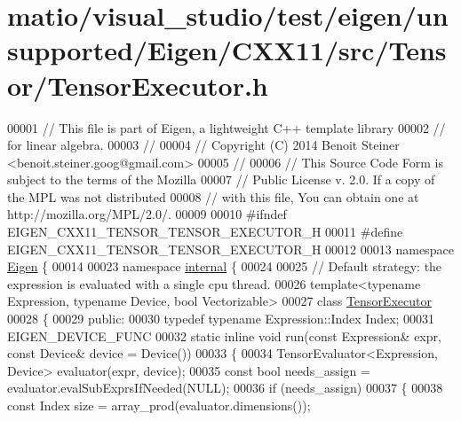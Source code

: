 \hypertarget{matio_2visual__studio_2test_2eigen_2unsupported_2_eigen_2_c_x_x11_2src_2_tensor_2_tensor_executor_8h_source}{}\section{matio/visual\+\_\+studio/test/eigen/unsupported/\+Eigen/\+C\+X\+X11/src/\+Tensor/\+Tensor\+Executor.h}
\label{matio_2visual__studio_2test_2eigen_2unsupported_2_eigen_2_c_x_x11_2src_2_tensor_2_tensor_executor_8h_source}

\begin{DoxyCode}
00001 \textcolor{comment}{// This file is part of Eigen, a lightweight C++ template library}
00002 \textcolor{comment}{// for linear algebra.}
00003 \textcolor{comment}{//}
00004 \textcolor{comment}{// Copyright (C) 2014 Benoit Steiner <benoit.steiner.goog@gmail.com>}
00005 \textcolor{comment}{//}
00006 \textcolor{comment}{// This Source Code Form is subject to the terms of the Mozilla}
00007 \textcolor{comment}{// Public License v. 2.0. If a copy of the MPL was not distributed}
00008 \textcolor{comment}{// with this file, You can obtain one at http://mozilla.org/MPL/2.0/.}
00009 
00010 \textcolor{preprocessor}{#ifndef EIGEN\_CXX11\_TENSOR\_TENSOR\_EXECUTOR\_H}
00011 \textcolor{preprocessor}{#define EIGEN\_CXX11\_TENSOR\_TENSOR\_EXECUTOR\_H}
00012 
00013 \textcolor{keyword}{namespace }\hyperlink{namespace_eigen}{Eigen} \{
00014 
00023 \textcolor{keyword}{namespace }\hyperlink{namespaceinternal}{internal} \{
00024 
00025 \textcolor{comment}{// Default strategy: the expression is evaluated with a single cpu thread.}
00026 \textcolor{keyword}{template}<\textcolor{keyword}{typename} Expression, \textcolor{keyword}{typename} Device, \textcolor{keywordtype}{bool} Vectorizable>
00027 \textcolor{keyword}{class }\hyperlink{class_tensor_executor}{TensorExecutor}
00028 \{
00029  \textcolor{keyword}{public}:
00030   \textcolor{keyword}{typedef} \textcolor{keyword}{typename} Expression::Index Index;
00031   EIGEN\_DEVICE\_FUNC
00032   \textcolor{keyword}{static} \textcolor{keyword}{inline} \textcolor{keywordtype}{void} run(\textcolor{keyword}{const} Expression& expr, \textcolor{keyword}{const} Device& device = Device())
00033   \{
00034     TensorEvaluator<Expression, Device> evaluator(expr, device);
00035     \textcolor{keyword}{const} \textcolor{keywordtype}{bool} needs\_assign = evaluator.evalSubExprsIfNeeded(NULL);
00036     \textcolor{keywordflow}{if} (needs\_assign)
00037     \{
00038       \textcolor{keyword}{const} Index size = array\_prod(evaluator.dimensions());

\end{DoxyCode}

